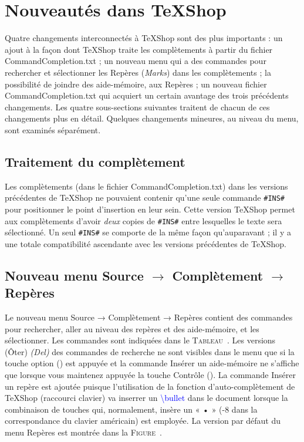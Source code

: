 \documentclass[12pt,french]{article}
\newcommand{\alt}{{\WD \symbol{85}}}
\newcommand{\ctr}{{\WD \symbol{84}}}
\newcommand{\texs}{\textsf{\TeX{}Shop}}
\newcommand{\fontelatex}{\ttfamily}
\newcommand{\com}[1]{{\fontelatex\textcolor{blue}{\textbackslash#1}}}
\begin{document}
\section*{Nouveautés dans \texs}

\mbox{Q}uatre changements interconnectés à \texs{} sont des plus importants : un ajout à la façon dont \texs{} traite 
les complètements à partir du fichier \textsf{CommandCompletion.txt} ; un nouveau menu qui a des commandes pour 
rechercher et sélectionner les Repères (\emph{Marks}) dans les complètements ; la possibilité de joindre des aide-mémoire, aux Repères ; un nouveau fichier \textsf{CommandCompletion.txt} qui acquiert un certain avantage 
des trois précédents changements. Les quatre sous-sections suivantes traitent de chacun de ces changements plus 
en détail. \mbox{Q}uelques changements mineures, au niveau du menu, sont examinés séparément.

\subsection*{Traitement du complètement}

Les complètements (dans le fichier \textsf{CommandCompletion.txt}) dans les versions précédentes de \texs{} ne 
pouvaient contenir qu'une seule commande \texttt{\#INS\#} pour positionner le point d'insertion en leur sein. Cette 
version \texs{} permet aux complètements d'avoir \emph{deux} copies de \texttt{\#INS\#} entre lesquelles le texte 
sera sélectionné. Un seul \texttt{\#INS\#} se comporte de la même façon qu'auparavant ; il y a une totale compatibilité 
ascendante avec les versions précédentes de \texs.

\subsection*{Nouveau menu Source $\rightarrow$ Complètement $\rightarrow$ Repères}

Le nouveau menu \textsf{Source} → \textsf{Complètement} → \textsf{Repères} contient des commandes pour 
rechercher, aller au niveau des repères et des aide-mémoire, et les sélectionner. Les commandes sont indiquées 
dans le \textsc{Tableau}~. Les versions \textsf{(Ôter)} \emph{(Del)} des 
commandes de recherche ne sont visibles dans le menu que si la touche option (\alt) est appuyée et la commande 
\textsf{Insérer un aide-mémoire} ne s'affiche que lorsque vous maintenez appuyée la touche Contrôle (\ctr). La 
commande \textsf{Insérer un repère} est ajoutée puisque l'utilisation de la fonction d'auto-complètement de \texs{} 
(raccourci clavier) va inserrer un \com{bullet} dans le document lorsque la combinaison de touches qui, 
normalement, insère un « • » (\alt-8 dans la correspondance du clavier américain) est employée. La version par 
défaut du menu \textsf{Repères} est montrée dans la \textsc{Figure}~.
\end{document}
